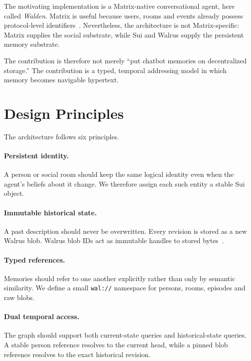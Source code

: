 \documentclass[11pt]{article}
\begin{document}
The motivating implementation is a Matrix-native conversational agent, here called \emph{Walden}. Matrix is useful because users, rooms and events already possess protocol-level identifiers~\cite{matrix-spec}. Nevertheless, the architecture is not Matrix-specific: Matrix supplies the social substrate, while Sui and Walrus supply the persistent memory substrate.

The contribution is therefore not merely ``put chatbot memories on decentralized storage.'' The contribution is a typed, temporal addressing model in which memory becomes navigable hypertext.

\section{Design Principles}

The architecture follows six principles.

\paragraph{Persistent identity.}
A person or social room should keep the same logical identity even when the agent's beliefs about it change. We therefore assign each such entity a stable Sui object.

\paragraph{Immutable historical state.}
A past description should never be overwritten. Every revision is stored as a new Walrus blob. Walrus blob IDs act as immutable handles to stored bytes~\cite{walrus-lineage}.

\paragraph{Typed references.}
Memories should refer to one another explicitly rather than only by semantic similarity. We define a small \texttt{wal://} namespace for persons, rooms, episodes and raw blobs.

\paragraph{Dual temporal access.}
The graph should support both current-state queries and historical-state queries. A stable person reference resolves to the current head, while a pinned blob reference resolves to the exact historical revision.
\end{document}

